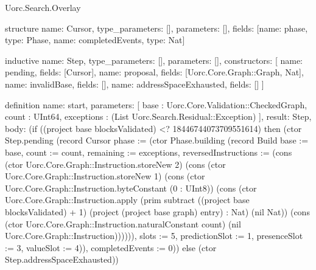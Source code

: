 \begin{lexlean}{Uorc.Search.Overlay}
\begin{semanticmodule}
structure{
  name: Cursor,
  type_parameters: [],
  parameters: [],
  fields: [{name: phase, type: Phase}, {name: completedEvents, type: Nat}]
}

inductive{
  name: Step,
  type_parameters: [],
  parameters: [],
  constructors: [
    {name: pending, fields: [Cursor]},
    {name: proposal, fields: [Uorc.Core.Graph::Graph, Nat]},
    {name: invalidBase, fields: []},
    {name: addressSpaceExhausted, fields: []}
  ]
}

definition{
  name: start,
  parameters: [
    base : Uorc.Core.Validation::CheckedGraph,
    count : UInt64,
    exceptions : (List Uorc.Search.Residual::Exception)
  ],
  result: Step,
  body: (if ((project base blocksValidated) <? 18446744073709551614) then (ctor Step.pending (record Cursor {phase := (ctor Phase.building (record Build {base := base, count := count, remaining := exceptions, reversedInstructions := (cons (ctor Uorc.Core.Graph::Instruction.storeNew 2) (cons (ctor Uorc.Core.Graph::Instruction.storeNew 1) (cons (ctor Uorc.Core.Graph::Instruction.byteConstant (0 : UInt8)) (cons (ctor Uorc.Core.Graph::Instruction.apply (prim subtract ((project base blocksValidated) + 1) (project (project base graph) entry) : Nat) (nil Nat)) (cons (ctor Uorc.Core.Graph::Instruction.naturalConstant count) (nil Uorc.Core.Graph::Instruction)))))), slots := 5, predictionSlot := 1, presenceSlot := 3, valueSlot := 4})), completedEvents := 0})) else (ctor Step.addressSpaceExhausted))
}


\end{semanticmodule}
\end{lexlean}
